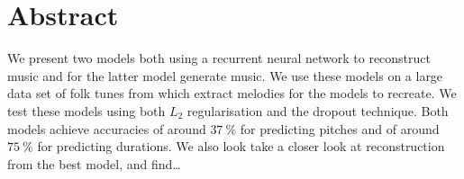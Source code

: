 \section*{Abstract}
\label{sec:abstract}

We present two models both using a recurrent neural network to reconstruct music and for the latter model generate music.
We use these models on a large data set of folk tunes from which extract melodies for the models to recreate.
We test these models using both $L_2$ regularisation and the dropout technique.
Both models achieve accuracies of around $\SI{37}{\%}$ for predicting pitches and of around $\SI{75}{\%}$ for predicting durations.
We also look take a closer look at reconstruction from the best model, and find\dots {}
